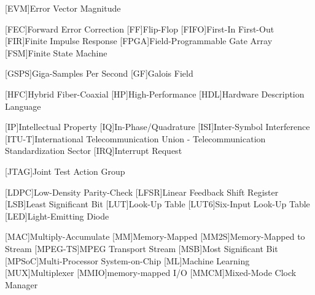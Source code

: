 [EVM]{Error Vector Magnitude}

[FEC]{Forward Error Correction}
[FF]{Flip-Flop}
[FIFO]{First-In First-Out}
[FIR]{Finite Impulse Response}
[FPGA]{Field-Programmable Gate Array}
[FSM]{Finite State Machine}

[GSPS]{Giga-Samples Per Second}
[GF]{Galois Field}

[HFC]{Hybrid Fiber-Coaxial}
[HP]{High-Performance}
[HDL]{Hardware Description Language}

[IP]{Intellectual Property}
[IQ]{In-Phase/Quadrature}
[ISI]{Inter-Symbol Interference}
[ITU-T]{International Telecommunication Union - Telecommunication Standardization Sector}
[IRQ]{Interrupt Request}

[JTAG]{Joint Test Action Group}

[LDPC]{Low-Density Parity-Check}
[LFSR]{Linear Feedback Shift Register}
[LSB]{Least Significant Bit}
[LUT]{Look-Up Table}
[LUT6]{Six-Input Look-Up Table}
[LED]{Light-Emitting Diode}

[MAC]{Multiply-Accumulate}
[MM]{Memory-Mapped}
[MM2S]{Memory-Mapped to Stream}
[MPEG-TS]{MPEG Transport Stream}
[MSB]{Most Significant Bit}
[MPSoC]{Multi-Processor System-on-Chip}
[ML]{Machine Learning}
[MUX]{Multiplexer}
[MMIO]{memory-mapped I/O}
[MMCM]{Mixed-Mode Clock Manager}


